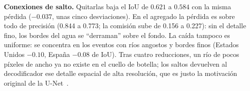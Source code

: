 \textbf{Conexiones de salto.} Quitarlas baja el IoU de $0.621$ a $0.584$ con la misma pérdida
($-0.037$, unas cinco desviaciones). En el agregado la pérdida es sobre todo de precisión
(0.844 a 0.773; la comisión sube de 0.156 a 0.227): sin el detalle fino, los bordes del agua se
``derraman'' sobre el fondo. La caída tampoco es uniforme: se concentra en los eventos con
ríos angostos y bordes finos (Estados Unidos $-0.10$, España $-0.08$ de IoU). Tras cuatro
reducciones, un río de pocos píxeles de ancho ya no existe en el cuello de botella; los saltos
devuelven al decodificador ese detalle espacial de alta resolución, que es justo la motivación
original de la U-Net~\cite{ronneberger2015unet}.
